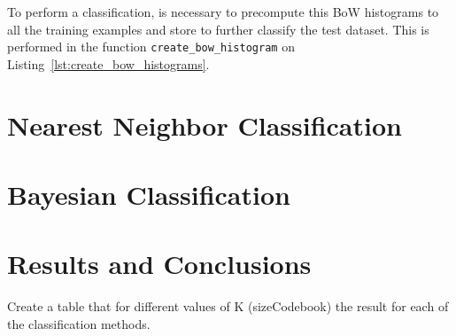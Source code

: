 \documentclass{ethz_report}
\begin{document}


To perform a classification, is necessary to precompute this BoW histograms to all the training examples and store to further classify the test dataset. This is performed in the function \texttt{create\_bow\_histogram} on Listing~\ref{lst:create_bow_histograms}.



\section*{Nearest Neighbor Classification}

\section*{Bayesian Classification}

\section*{Results and Conclusions}

Create a table that for different values of K (sizeCodebook) the result for each of the classification methods.
\end{document}
